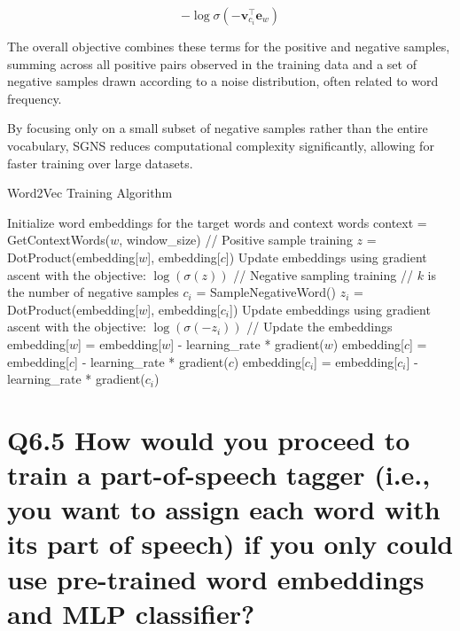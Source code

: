 \documentclass[11pt]{article}
\begin{document}
\begin{equation}
    -\log \sigma(-\mathbf{v}_{c_i}^\top \mathbf{e}_w)
\end{equation}

The overall objective combines these terms for the positive and negative samples, summing across all positive pairs observed in the training data and a set of negative samples drawn according to a noise distribution, often related to word frequency.

By focusing only on a small subset of negative samples rather than the entire vocabulary, SGNS reduces computational complexity significantly, allowing for faster training over large datasets.

\begin{algorithm}
\caption{Word2Vec Training Algorithm}
\begin{algorithmic}[1]
\State Initialize word embeddings for the target words and context words
        \State context = GetContextWords($w$, window\_size)
            \State // Positive sample training
            \State $z$ = DotProduct(embedding[$w$], embedding[$c$])
            \State Update embeddings using gradient ascent with the objective: $\log(\sigma(z))$
            \State // Negative sampling training
             // $k$ is the number of negative samples
                \State $c_i$ = SampleNegativeWord()
                \State $z_i$ = DotProduct(embedding[$w$], embedding[$c_i$])
                \State Update embeddings using gradient ascent with the objective: $\log(\sigma(-z_i))$
            \EndFor
            \State // Update the embeddings
            \State embedding[$w$] = embedding[$w$] - learning\_rate * gradient($w$)
            \State embedding[$c$] = embedding[$c$] - learning\_rate * gradient($c$)
                \State embedding[$c_i$] = embedding[$c_i$] - learning\_rate * gradient($c_i$)
            \EndFor
        \EndFor
    \EndFor
\EndFor
\end{algorithmic}
\end{algorithm}

\section{Q6.5 How would you proceed to train a part-of-speech tagger (i.e., you want to assign each word with its part of speech) if you only could use pre-trained word embeddings and MLP classifier?}
\end{document}
